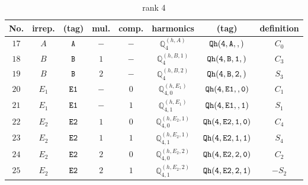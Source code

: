 \documentclass[fleqn,8pt]{jsarticle}
\begin{document}
\begin{table}[ht!]
\begin{center}
\caption{rank 4}
\renewcommand{\arraystretch}{1.3}
\begin{tabular}{cccccccc} \hline \hline
No. & irrep. & (tag) & mul. & comp. & harmonics & (tag) & definition \\ \hline
$ 17 $ & $ A $ & $ {\tt A} $ & $ - $ & $ - $ & $ \mathbb{Q}_{4}^{(h,A)} $ & $ {\tt Qh(4,A,,)} $ & $ C_{0} $ \\
$ 18 $ & $ B $ & $ {\tt B} $ & $ 1 $ & $ - $ & $ \mathbb{Q}_{4}^{(h,B,1)} $ & $ {\tt Qh(4,B,1,)} $ & $ C_{3} $ \\
$ 19 $ & $ B $ & $ {\tt B} $ & $ 2 $ & $ - $ & $ \mathbb{Q}_{4}^{(h,B,2)} $ & $ {\tt Qh(4,B,2,)} $ & $ S_{3} $ \\
$ 20 $ & $ E_{1} $ & $ {\tt E1} $ & $ - $ & $ 0 $ & $ \mathbb{Q}_{4,0}^{(h,E_{1})} $ & $ {\tt Qh(4,E1,,0)} $ & $ C_{1} $ \\
$ 21 $ & $ E_{1} $ & $ {\tt E1} $ & $ - $ & $ 1 $ & $ \mathbb{Q}_{4,1}^{(h,E_{1})} $ & $ {\tt Qh(4,E1,,1)} $ & $ S_{1} $ \\
$ 22 $ & $ E_{2} $ & $ {\tt E2} $ & $ 1 $ & $ 0 $ & $ \mathbb{Q}_{4,0}^{(h,E_{2},1)} $ & $ {\tt Qh(4,E2,1,0)} $ & $ C_{4} $ \\
$ 23 $ & $ E_{2} $ & $ {\tt E2} $ & $ 1 $ & $ 1 $ & $ \mathbb{Q}_{4,1}^{(h,E_{2},1)} $ & $ {\tt Qh(4,E2,1,1)} $ & $ S_{4} $ \\
$ 24 $ & $ E_{2} $ & $ {\tt E2} $ & $ 2 $ & $ 0 $ & $ \mathbb{Q}_{4,0}^{(h,E_{2},2)} $ & $ {\tt Qh(4,E2,2,0)} $ & $ C_{2} $ \\
$ 25 $ & $ E_{2} $ & $ {\tt E2} $ & $ 2 $ & $ 1 $ & $ \mathbb{Q}_{4,1}^{(h,E_{2},2)} $ & $ {\tt Qh(4,E2,2,1)} $ & $ - S_{2} $ \\
 \hline \hline
\end{tabular}
\end{center}
\end{table}
\end{document}
